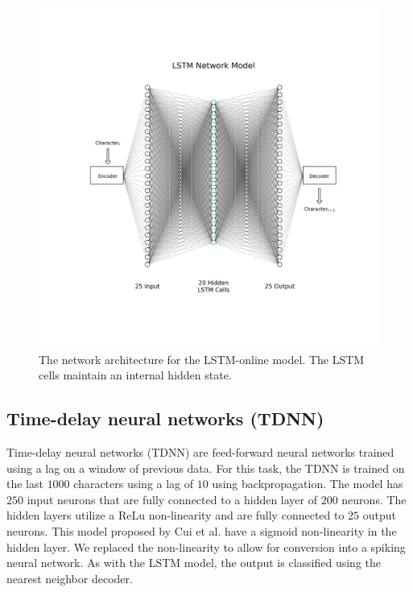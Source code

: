 \documentclass{article}
\begin{document}
\begin{figure}[!h]
    \centering
    \includegraphics[width=\linewidth]{../diagrams/lstm.png}
    \caption{The network architecture for the LSTM-online model. The LSTM cells maintain an internal hidden state.}
    \label{fig:lstm-online-model}
\end{figure}

\subsection*{Time-delay neural networks (TDNN)}

Time-delay neural networks (TDNN) are feed-forward neural networks trained using a lag on a window of previous data. \cite{waibel1995phoneme} For this task, the TDNN is trained on the last $1000$ characters using a lag of $10$ using backpropagation. \cite{rojas1996backpropagation} The model has $250$ input neurons that are fully connected to a hidden layer of $200$ neurons. The hidden layers utilize a ReLu non-linearity and are fully connected to $25$ output neurons. This model proposed by Cui et al. have a sigmoid non-linearity in the hidden layer. We replaced the non-linearity to allow for conversion into a spiking neural network. As with the LSTM model, the output is classified using the nearest neighbor decoder.
\end{document}
